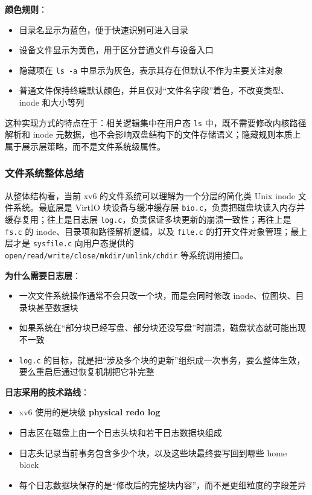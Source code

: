 \documentclass[12pt,a4paper]{ctexart}
\begin{document}
\textbf{颜色规则}：
\begin{itemize}
  \item 目录名显示为蓝色，便于快速识别可进入目录
  \item 设备文件显示为黄色，用于区分普通文件与设备入口
  \item 隐藏项在 \texttt{ls -a} 中显示为灰色，表示其存在但默认不作为主要关注对象
  \item 普通文件保持终端默认颜色，并且仅对“文件名字段”着色，不改变类型、inode 和大小等列
\end{itemize}

这种实现方式的特点在于：相关逻辑集中在用户态 \texttt{ls} 中，既不需要修改内核路径解析和 inode 元数据，也不会影响双盘结构下的文件存储语义；隐藏规则本质上属于展示层策略，而不是文件系统级属性。

\subsubsection{文件系统整体总结}

从整体结构看，当前 xv6 的文件系统可以理解为一个分层的简化类 Unix inode 文件系统。最底层是 VirtIO 块设备与缓冲缓存层 \texttt{bio.c}，负责把磁盘块读入内存并缓存复用；往上是日志层 \texttt{log.c}，负责保证多块更新的崩溃一致性；再往上是 \texttt{fs.c} 的 inode、目录项和路径解析逻辑，以及 \texttt{file.c} 的打开文件对象管理；最上层才是 \texttt{sysfile.c} 向用户态提供的 \texttt{open/read/write/close/mkdir/unlink/chdir} 等系统调用接口。

\textbf{为什么需要日志层}：
\begin{itemize}
  \item 一次文件系统操作通常不会只改一个块，而是会同时修改 inode、位图块、目录块甚至数据块
  \item 如果系统在“部分块已经写盘、部分块还没写盘”时崩溃，磁盘状态就可能出现不一致
  \item \texttt{log.c} 的目标，就是把“涉及多个块的更新”组织成一次事务，要么整体生效，要么重启后通过恢复机制把它补完整
\end{itemize}

\textbf{日志采用的技术路线}：
\begin{itemize}
  \item xv6 使用的是块级 \textbf{physical redo log}
  \item 日志区在磁盘上由一个日志头块和若干日志数据块组成
  \item 日志头记录当前事务包含多少个块，以及这些块最终要写回到哪些 home block
  \item 每个日志数据块保存的是“修改后的完整块内容”，而不是更细粒度的字段差异
\end{itemize}
\end{document}
